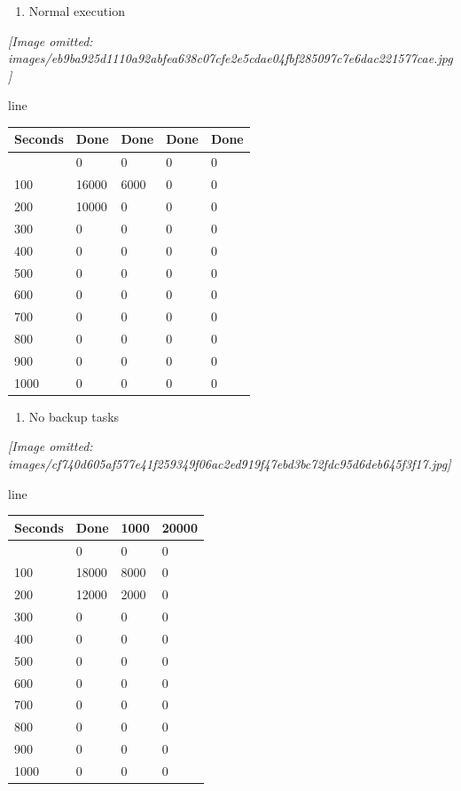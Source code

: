 \documentclass[
]{article}
\newcounter{none} %
\providecommand{\tightlist}{%
  \setlength{\itemsep}{0pt}\setlength{\parskip}{0pt}}
\begin{document}
\begin{enumerate}
\def\labelenumi{(\alph{enumi})}
\tightlist
\item
  Normal execution
\end{enumerate}

\textit{[Image omitted: images/eb9ba925d1110a92abfea638c07cfe2e5cdae04fbf285097c7e6dac221577cae.jpg]}

line

{\def\LTcaptype{none} %
\begin{longtable}[]{@{}lllll@{}}
\toprule\noalign{}
Seconds & Done & Done & Done & Done \\
\midrule\noalign{}
\endhead
\bottomrule\noalign{}
\endlastfoot
0 & 0 & 0 & 0 & 0 \\
100 & 16000 & 6000 & 0 & 0 \\
200 & 10000 & 0 & 0 & 0 \\
300 & 0 & 0 & 0 & 0 \\
400 & 0 & 0 & 0 & 0 \\
500 & 0 & 0 & 0 & 0 \\
600 & 0 & 0 & 0 & 0 \\
700 & 0 & 0 & 0 & 0 \\
800 & 0 & 0 & 0 & 0 \\
900 & 0 & 0 & 0 & 0 \\
1000 & 0 & 0 & 0 & 0 \\
\end{longtable}
}

\begin{enumerate}
\def\labelenumi{(\alph{enumi})}
\setcounter{enumi}{1}
\tightlist
\item
  No backup tasks
\end{enumerate}

\textit{[Image omitted: images/cf740d605af577e41f259349f06ac2ed919f47ebd3bc72fdc95d6deb645f3f17.jpg]}

line

{\def\LTcaptype{none} %
\begin{longtable}[]{@{}llll@{}}
\toprule\noalign{}
Seconds & Done & 1000 & 20000 \\
\midrule\noalign{}
\endhead
\bottomrule\noalign{}
\endlastfoot
0 & 0 & 0 & 0 \\
100 & 18000 & 8000 & 0 \\
200 & 12000 & 2000 & 0 \\
300 & 0 & 0 & 0 \\
400 & 0 & 0 & 0 \\
500 & 0 & 0 & 0 \\
600 & 0 & 0 & 0 \\
700 & 0 & 0 & 0 \\
800 & 0 & 0 & 0 \\
900 & 0 & 0 & 0 \\
1000 & 0 & 0 & 0 \\
\end{longtable}
}
\end{document}
